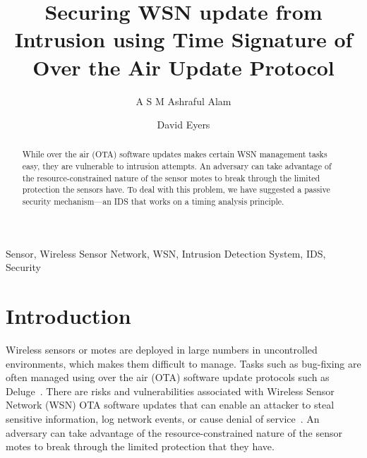 \documentclass{CRPITStyle}
\renewcommand{\cite}{\citep}
\begin{document}
\title{Securing WSN update from Intrusion using Time Signature of Over the Air Update Protocol}
\author{A S M Ashraful Alam  \and  David Eyers 	  }

\maketitle

\newcommand\conferencenameandplace{13th Australasian Symposium on Parallel and Distributed Computing (AusPDC 2015), Sydney, Australia, January 2015}
      \newcommand\volumenumber{163}
      \newcommand\conferenceyear{2015}
      \newcommand\editorname{Bahman Javadi and Saurabh Kumar Garg}
      \toappearstandard 


\begin{abstract}
While over the air (OTA) software updates makes certain WSN management tasks easy, they are vulnerable to intrusion attempts.
An adversary can take advantage of the resource-constrained nature of the sensor motes to break through the limited protection the sensors have.
To deal with this problem, we have suggested a passive security mechanism---an IDS that works on a timing analysis principle.  
\end{abstract}
\vspace{.1in}

 Sensor, Wireless Sensor Network, WSN, Intrusion Detection System, IDS, Security

\section{Introduction}
\label{sec:intro}

Wireless sensors or motes are deployed in large numbers in uncontrolled environments, which makes them difficult to manage.
Tasks such as bug-fixing are often managed using over the air (OTA) software update protocols such as Deluge~\cite{1031506}.
There are risks and vulnerabilities associated with Wireless Sensor Network (WSN) OTA software updates that can enable an attacker to steal sensitive information, log network events, or cause denial of service~\cite{1127826}.
An adversary can take advantage of the resource-constrained nature of the sensor motes to break through the limited protection that they have.
\end{document}
